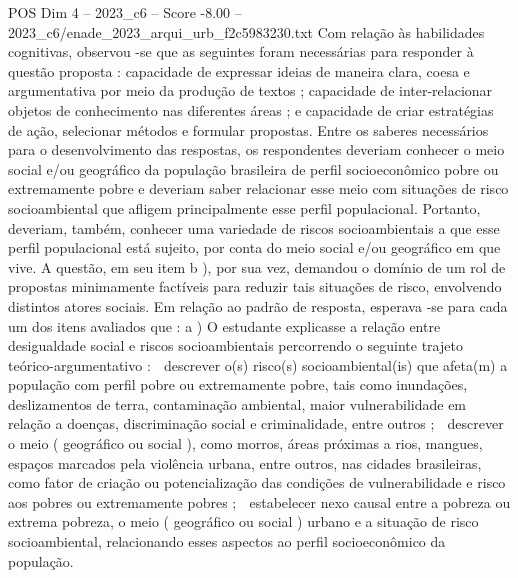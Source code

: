 \begin{textsample}{POS Dim 4 – 2023\_c6 – Score -8.00 – 2023\_c6/enade\_2023\_arqui\_urb\_f2c5983230.txt}
Com relação às habilidades cognitivas, observou -se que as seguintes foram necessárias para responder à questão proposta : capacidade de expressar ideias de maneira clara, coesa e argumentativa por meio da produção de textos ; capacidade de inter-relacionar objetos de conhecimento nas diferentes áreas ; e capacidade de criar estratégias de ação, selecionar métodos e formular propostas.
Entre os saberes necessários para o desenvolvimento das respostas, os respondentes deveriam conhecer o meio social e/ou geográfico da população brasileira de perfil socioeconômico pobre ou extremamente pobre e deveriam saber relacionar esse meio com situações de risco socioambiental que afligem principalmente esse perfil populacional.
Portanto, deveriam, também, conhecer uma variedade de riscos socioambientais a que esse perfil populacional está sujeito, por conta do meio social e/ou geográfico em que vive.
A questão, em seu item b ), por sua vez, demandou o domínio de um rol de propostas minimamente factíveis para reduzir tais situações de risco, envolvendo distintos atores sociais.
Em relação ao padrão de resposta, esperava -se para cada um dos itens avaliados que : a ) O estudante explicasse a relação entre desigualdade social e riscos socioambientais percorrendo o seguinte trajeto teórico-argumentativo :  descrever o(s) risco(s) socioambiental(is) que afeta(m) a população com perfil pobre ou extremamente pobre, tais como inundações, deslizamentos de terra, contaminação ambiental, maior vulnerabilidade em relação a doenças, discriminação social e criminalidade, entre outros ;  descrever o meio ( geográfico ou social ), como morros, áreas próximas a rios, mangues, espaços marcados pela violência urbana, entre outros, nas cidades brasileiras, como fator de criação ou potencialização das condições de vulnerabilidade e risco aos pobres ou extremamente pobres ;  estabelecer nexo causal entre a pobreza ou extrema pobreza, o meio ( geográfico ou social ) urbano e a situação de risco socioambiental, relacionando esses aspectos ao perfil socioeconômico da população.

\end{textsample}
